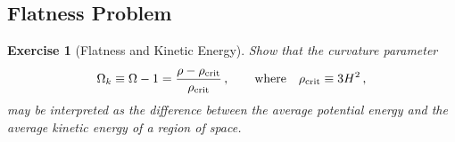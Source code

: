 \documentclass[12pt,letterpaper,rotate]{article}
\def\beq{\begin{equation}}
\def\eeq{\end{equation}}
\def\d{{\rm d}}
\newtheorem{thm}{Exercise}
\begin{document}
{%


\subsection{Flatness Problem}
\label{sec:flatness}

\begin{thm}[Flatness and Kinetic Energy]
Show that the curvature parameter $$\Omega_k \equiv \Omega - 1= \frac{\rho-\rho_{\rm crit}}{\rho_{\rm crit}}\, , \qquad {\rm where} \quad \rho_{\rm crit} \equiv 3 H^2\, ,$$ may be interpreted as the difference between the average potential energy and the average kinetic energy of a region of space.
\label{ex:flatness}
\end{thm}

}
\end{document}
